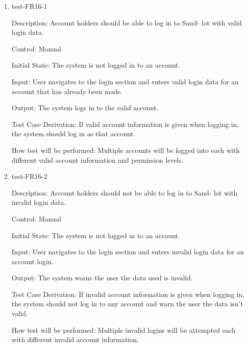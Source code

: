 \documentclass[12pt, titlepage]{article}
\begin{document}
\begin{enumerate}
  \item{test-FR16-1\\}
  
  Description: Account holders should be able to log in to Sand-
  lot with valid login data.

  Control: Manual

  Initial State: The system is not logged in to an account.

  Input: User navigates to the login section and enters valid login data for
  an account that has already been made.

  Output: The system logs in to the valid account.

  Test Case Derivation: If valid account information is given when logging in,
  the system should log in as that account.

  How test will be performed: Multiple accounts will be logged into each with
  different valid account information and permission levels.

  \item{test-FR16-2\\}
  
  Description: Account holders should not be able to log in to Sand-
  lot with invalid login data.

  Control: Manual

  Initial State: The system is not logged in to an account.

  Input: User navigates to the login section and enters invalid login data
  for an account login.

  Output: The system warns the user the data used is invalid.

  Test Case Derivation: If invalid account information is given when logging
  in, the system should not log in to any account and warn the user the data
  isn't valid.

  How test will be performed: Multiple invalid logins will be attempted each
  with different invalid account information.








\end{enumerate}
\end{document}
